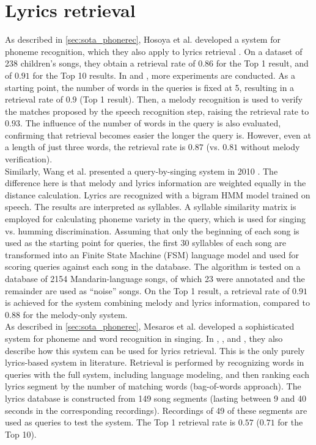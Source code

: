 \section{Lyrics retrieval}
As described in \ref{sec:sota_phonerec}, Hosoya et al. developed a system for phoneme recognition, which they also apply to lyrics retrieval \cite{Hosoya2005}. On a dataset of 238 children's songs, they obtain a retrieval rate of $0.86$ for the Top 1 result, and of $0.91$ for the Top 10 results. In \cite{suzuki06} and \cite{suzuki07}, more experiments are conducted. As a starting point, the number of words in the queries is fixed at 5, resulting in a retrieval rate of $0.9$ (Top 1 result). Then, a melody recognition is used to verify the matches proposed by the speech recognition step, raising the retrieval rate to $0.93$. The influence of the number of words in the query is also evaluated, confirming that retrieval becomes easier the longer the query is. However, even at a length of just three words, the retrieval rate is $0.87$ (vs. $0.81$ without melody verification).\\

Similarly, Wang et al. presented a query-by-singing system in 2010 \cite{Wang2010}. The difference here is that melody and lyrics information are weighted equally in the distance calculation. Lyrics are recognized with a bigram HMM model trained on speech. The results are interpreted as syllables. A syllable similarity matrix is employed for calculating phoneme variety in the query, which is used for singing vs. humming discrimination. Assuming that only the beginning of each song is used as the starting point for queries, the first 30 syllables of each song are transformed into an Finite State Machine (FSM) language model and used for scoring queries against each song in the database. The algorithm is tested on a database of 2154 Mandarin-language songs, of which 23 were annotated and the remainder are used as ``noise'' songs. On the Top 1 result, a retrieval rate of $0.91$ is achieved for the system combining melody and lyrics information, compared to $0.88$ for the melody-only system.\\

As described in \ref{sec:sota_phonerec}, Mesaros et al. developed a sophisticated system for phoneme and word recognition in singing. In \cite{mesaros1}, \cite{mesaros2}, and \cite{Mesaros2011}, they also describe how this system can be used for lyrics retrieval. This is the only purely lyrics-based system in literature. Retrieval is performed by recognizing words in queries with the full system, including language modeling, and then ranking each lyrics segment by the number of matching words (bag-of-words approach). The lyrics database is constructed from 149 song segments (lasting between 9 and 40 seconds in the corresponding recordings). Recordings of 49 of these segments are used as queries to test the system. The Top 1 retrieval rate is $0.57$ ($0.71$ for the Top 10).


